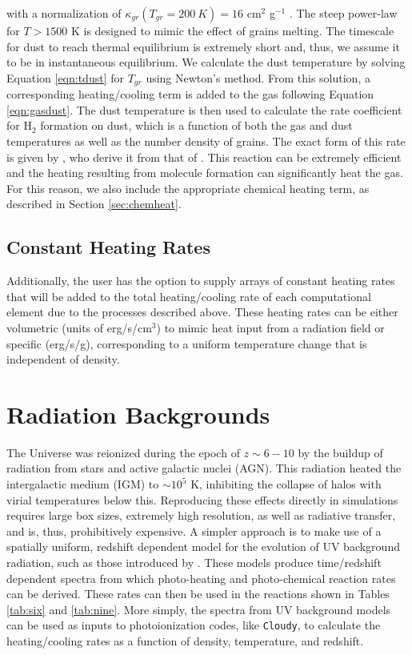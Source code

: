 with a normalization of $\kappa_{gr}(T_{gr} = 200~K) = 16$ cm$^{2}$ g$^{-1}$
\citep{1994ApJ...421..615P, 2000ApJ...534..809O}.  The steep power-law
for $T > 1500$ K is designed to mimic the effect of grains melting.
The timescale for dust to reach thermal equilibrium is extremely
short and, thus, we assume it to be in instantaneous equilibrium.  We
calculate the dust temperature by solving Equation \ref{eqn:tdust} for
$T_{gr}$ using Newton's method.  From this solution, a corresponding
heating/cooling term is added to the gas following Equation
\ref{eqn:gasdust}.  The dust temperature is then used to calculate the
rate coefficient for H$_{2}$ formation on dust, which is a function of
both the gas and dust temperatures as well as the number density of
grains.  The exact form of this rate is given by
\citet{2000ApJ...534..809O}, who derive it from that of
\citet{1985ApJ...291..722T}.  This reaction can be extremely
efficient and the heating resulting from molecule formation can
significantly heat the gas.  For this reason, we also include the
appropriate chemical heating term, as described in Section
\ref{sec:chemheat}.

\subsection{Constant Heating Rates}

Additionally, the user has the option to supply arrays of constant
heating rates that will be added to the total heating/cooling rate
of each computational element due to the processes described above.
These heating rates can be either volumetric (units of
erg/s/cm$^{3}$) to mimic heat input from a radiation field or
specific (erg/s/g), corresponding to a uniform temperature change that
is independent of density.


\section{Radiation Backgrounds}
\label{section:radback}

The Universe was reionized during the epoch of $z \sim 6-10$ by the
buildup of radiation from stars and active galactic nuclei (AGN).
This radiation heated the intergalactic medium (IGM) to $\sim10^{5}$
K, inhibiting the collapse of halos with virial temperatures below
this.  Reproducing these effects directly in simulations requires 
large box sizes, extremely high resolution, as well as radiative
transfer, and is, thus, prohibitively expensive.  A simpler approach
is to make use of a spatially uniform, redshift dependent model for
the evolution of UV background radiation, such as those introduced by
\citet{1996ApJ...461...20H}.  These models produce time/redshift
dependent spectra from which photo-heating and photo-chemical reaction
rates can be derived.  These rates can then be used in the reactions
shown in Tables \ref{tab:six} and \ref{tab:nine}.  More simply, the
spectra from UV background models can be used as inputs to
photoionization codes, like \texttt{Cloudy}, to calculate the
heating/cooling rates as a function of density, temperature, and
redshift.

